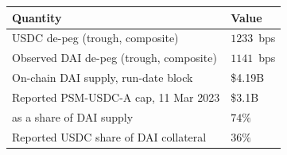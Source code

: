 \begin{tabular}{@{}p{6.4cm}p{4.0cm}@{}}
\toprule
Quantity & Value \\
\midrule
USDC de-peg (trough, composite) & $1233$~bps \\
Observed DAI de-peg (trough, composite) & $1141$~bps \\
On-chain DAI supply, run-date block & \$4.19B \\
Reported PSM-USDC-A cap, 11 Mar 2023 & \$3.1B \\
\quad as a share of DAI supply & $74\%$ \\
Reported USDC share of DAI collateral & $36\%$ \\
\bottomrule
\end{tabular}
